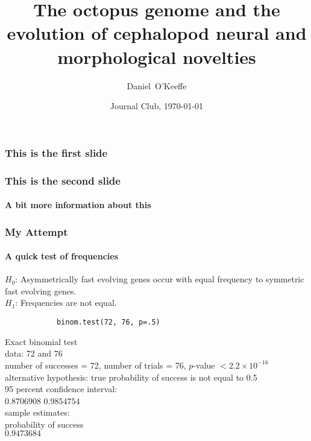 


\title[Journal Club]{The octopus genome and the evolution of cephalopod neural and morphological novelties}
\author[Daniel~O'Keeffe]{Daniel~O'Keeffe}%
\date[2015]{Journal Club, \today}
\subject{Genetics}


	\lstset{language=R}

	\frame{\titlepage}	

	\begin{frame}
		\frametitle{This is the first slide}
	\end{frame}
	\begin{frame}
		\frametitle{This is the second slide}
		\framesubtitle{A bit more information about this}
	\end{frame}

	

	\begin{frame}[fragile]
		\frametitle{My Attempt}
		\framesubtitle{A quick test of frequencies}
		$H_0$: Asymmetrically fast evolving genes occur with equal frequency to symmetric fast evolving genes.\\
		$H_1$: Frequencies are not equal.
		\begin{lstlisting}
			binom.test(72, 76, p=.5)
		\end{lstlisting}
		Exact binomial test\\

		data:  72 and 76\\
		number of successes = 72, number of trials = 76, $p$-value $< 2.2\times10^{-16}$\\
		alternative hypothesis: true probability of success is not equal to 0.5\\
		95 percent confidence interval:\\
		$0.8706908$ $0.9854754$\\
		sample estimates:\\
		probability of success\\ 
		$0.9473684$\\
	\end{frame}

	

